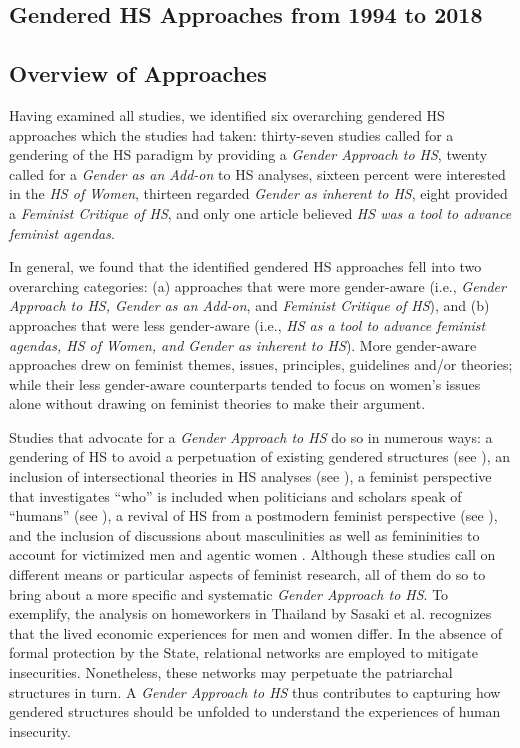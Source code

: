 \documentclass[10pt,a4paper]{article}
\begin{document}
\begin{multicols}{2}
\section{Gendered HS Approaches from 1994 to 2018}

\subsection{Overview of Approaches}

\noindent Having examined all studies, we identified six overarching gendered HS approaches which the studies had taken: thirty-seven studies called for a gendering of the HS paradigm by providing a \textit{Gender Approach to HS}, twenty called for a \textit{Gender as an Add-on} to HS analyses, sixteen percent were interested in the \textit{HS of Women}, thirteen regarded \textit{Gender as inherent to HS}, eight provided a \textit{Feminist Critique of HS}, and only one article believed \textit{HS was a tool to advance feminist agendas}. 

In general, we found that the identified gendered HS approaches fell into two overarching categories: (a) approaches that were more gender-aware (i.e., \textit{Gender Approach to HS, Gender as an Add-on}, and \textit{Feminist Critique of HS}), and (b) approaches that were less gender-aware (i.e., \textit{HS as a tool to advance feminist agendas, HS of Women, and Gender as inherent to HS}). More gender-aware approaches drew on feminist themes, issues, principles, guidelines and/or theories; while their less gender-aware counterparts tended to focus on women's issues alone without drawing on feminist theories to make their argument. 

Studies that advocate for a \textit{Gender Approach to HS} do so in numerous ways: a gendering of HS to avoid a perpetuation of existing gendered structures (see \citep{R28}), an inclusion of intersectional theories in HS analyses (see \citep{R35}), a feminist perspective that investigates ``who'' is included when politicians and scholars speak of ``humans'' (see \citep{R20}), a revival of HS from a postmodern feminist perspective (see \citep{R36}), and the inclusion of discussions about masculinities as well as femininities to account for victimized men and agentic women \citep{R17}. Although these studies call on different means or particular aspects of feminist research, all of them do so to bring about a more specific and systematic \textit{Gender Approach to HS}. To exemplify, the analysis on homeworkers in Thailand by Sasaki et al. \citep{R37} recognizes that the lived economic experiences for men and women differ. In the absence of formal protection by the State, relational networks are employed to mitigate insecurities. Nonetheless, these networks may perpetuate the patriarchal structures in turn. A \textit{Gender Approach to HS} thus contributes to capturing how gendered structures should be unfolded to understand the experiences of human insecurity.


\end{multicols}
\end{document}
